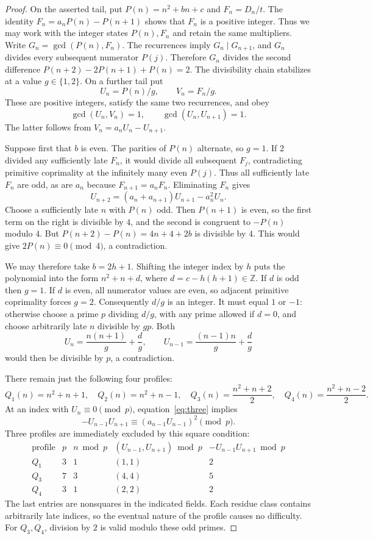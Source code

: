 \documentclass[11pt]{article}
\begin{document}
\begin{proof}
On the asserted tail, put $P(n)=n^2+bn+c$ and $F_n=D_n/t$.
The identity $F_n=a_nP(n)-P(n+1)$ shows that $F_n$ is a positive
integer. Thus we may work with the integer states $P(n),F_n$ and retain
the same multipliers. Write $G_n=\gcd(P(n),F_n)$.
The recurrences imply $G_n\mid G_{n+1}$, and $G_n$ divides every
subsequent numerator $P(j)$. Therefore $G_n$ divides the second
difference $P(n+2)-2P(n+1)+P(n)=2$. The divisibility chain stabilizes
at a value $g\in\{1,2\}$. On a further tail put
\[
 U_n=P(n)/g,\qquad V_n=F_n/g.
\]
These are positive integers, satisfy the same two recurrences, and obey
\[
 \gcd(U_n,V_n)=1,\qquad\gcd(U_n,U_{n+1})=1.
\]
The latter follows from $V_n=a_nU_n-U_{n+1}$.

Suppose first that $b$ is even. The parities of $P(n)$ alternate, so
$g=1$. If $2$ divided any sufficiently late $F_n$, it would divide
all subsequent $F_j$, contradicting primitive coprimality at the
infinitely many even $P(j)$. Thus all sufficiently late $F_n$ are odd,
as are $a_n$ because $F_{n+1}=a_nF_n$. Eliminating $F_n$ gives
\begin{equation}\label{eq:three}
 U_{n+2}=(a_n+a_{n+1})U_{n+1}-a_n^2U_n.
\end{equation}
Choose a sufficiently late $n$ with $P(n)$ odd. Then $P(n+1)$ is even,
so the first term on the right is divisible by $4$, and the second is
congruent to $-P(n)$ modulo $4$. But
$P(n+2)-P(n)=4n+4+2b$ is divisible by $4$. This would give
$2P(n)\equiv0\pmod4$, a contradiction.

We may therefore take $b=2h+1$. Shifting the integer index by $h$
puts the polynomial into the form $n^2+n+d$, where
$d=c-h(h+1)\in\mathbb Z$. If $d$ is odd then $g=1$. If $d$ is even,
all numerator values are even, so adjacent primitive coprimality forces
$g=2$. Consequently $d/g$ is an integer. It must equal $1$ or $-1$:
otherwise choose a prime $p$ dividing $d/g$, with any prime allowed if
$d=0$, and choose arbitrarily late $n$ divisible by $gp$. Both
\[
 U_n=\frac{n(n+1)}g+\frac dg,\qquad
 U_{n-1}=\frac{(n-1)n}g+\frac dg
\]
would then be divisible by $p$, a contradiction.

There remain just the following four profiles:
\[
 Q_1(n)=n^2+n+1,\quad Q_2(n)=n^2+n-1,\quad
 Q_3(n)=\frac{n^2+n+2}{2},\quad
 Q_4(n)=\frac{n^2+n-2}{2}.
\]
At an index with $U_n\equiv0\pmod p$, equation~\eqref{eq:three}
implies
\begin{equation}\label{eq:square}
 -U_{n-1}U_{n+1}\equiv(a_{n-1}U_{n-1})^2\pmod p.
\end{equation}
Three profiles are immediately excluded by this square condition:
\[
\begin{array}{c|c|c|c|c}
 \text{profile}&p&n\bmod p& (U_{n-1},U_{n+1})\bmod p
 &-U_{n-1}U_{n+1}\bmod p\\\hline
 Q_1&3&1&(1,1)&2\\
 Q_3&7&3&(4,4)&5\\
 Q_4&3&1&(2,2)&2
\end{array}
\]
The last entries are nonsquares in the indicated fields. Each residue
class contains arbitrarily late indices, so the eventual nature of the
profile causes no difficulty. For $Q_3,Q_4$, division by $2$ is valid
modulo these odd primes.


\end{proof}
\end{document}
